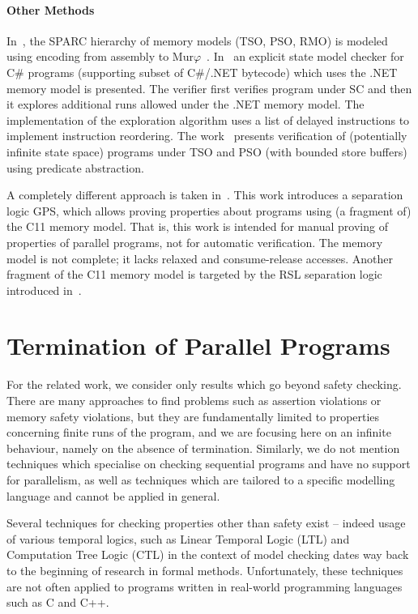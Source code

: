 \paragraph{Other Methods}\label{other-methods}

In~\cite{Park1995}, the SPARC hierarchy of memory models (TSO, PSO, RMO) is modeled using encoding from assembly to Mur\(\varphi\)~\cite{Murphi}.
In~\cite{Huynh2006} an explicit state model checker for C\# programs (supporting subset of C\#/.NET bytecode) which uses the .NET memory model is presented.
The verifier first verifies program under SC and then it explores additional runs allowed under the .NET memory model.
The implementation of the exploration algorithm uses a list of delayed instructions to implement instruction reordering.
The work~\cite{Dan2013} presents verification of (potentially infinite state space) programs under TSO and PSO (with bounded store buffers) using predicate abstraction.

A completely different approach is taken in~\cite{Turon2014}.
This work introduces a separation logic GPS, which allows proving properties about programs using (a fragment of) the C11 memory model.
That is, this work is intended for manual proving of properties of parallel programs, not for automatic verification.
The memory model is not complete; it lacks relaxed and consume-release accesses.
Another fragment of the C11 memory model is targeted by the RSL separation logic introduced in~\cite{Vafeiadis2013}.

\section{Termination of Parallel Programs}

For the related work, we consider only results which go beyond safety checking.
There are many approaches to find problems such as assertion violations or memory safety violations, but they are fundamentally limited to properties concerning finite runs of the program, and we are focusing here on an infinite behaviour, namely on the absence of termination.
Similarly, we do not mention techniques which specialise on checking sequential programs and have no support for parallelism, as well as techniques which are tailored to a specific modelling language and cannot be applied in general.

Several techniques for checking properties other than safety exist -- indeed
usage of various temporal logics, such as Linear Temporal Logic (LTL)
\cite[Chapter 5]{PoMC} and Computation Tree Logic (CTL) \cite[Chapter 6]{PoMC} in the context of model checking dates way back to the beginning of research in formal methods.
Unfortunately, these techniques are not often applied to programs written in real-world programming languages such as C and C++.

